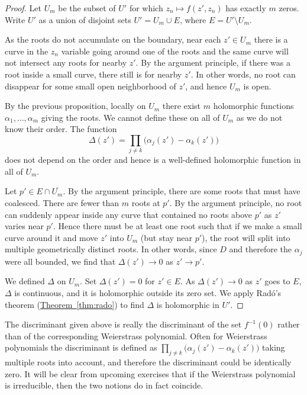 \documentclass[12pt,openany]{book}
\theoremstyle{plain}
\theoremstyle{remark}
\theoremstyle{definition}
\theoremstyle{exercise}
\theoremstyle{example}
\newcommand{\thmref}[1]{\hyperref[#1]{Theorem~\ref*{#1}}}
\begin{document}
\begin{proof}
Let $U_m$ be the subset of $U'$ for which $z_n \mapsto f(z',z_n)$
has exactly $m$ zeros.  Write $U'$ 
as a union of disjoint sets $U' = U_m \cup E$, where $E = U' \setminus U_m$.

As the roots do not accumulate on the boundary, near each $z' \in U_m$ there is a
curve in the $z_n$ variable going around one of the roots and the same curve
will not intersect any roots for nearby $z'$.
By the argument principle, if there was a root 
inside a small curve, there still is for nearby $z'$.  In other words, no
root can disappear for some small open neighborhood of $z'$, and hence $U_m$ is open.

By the previous
proposition, locally on $U_m$ there exist $m$ holomorphic functions
$\alpha_1, \ldots, \alpha_m$ giving the roots.  We cannot define
these on all of $U_m$ as we do not know their order.  The function
\begin{equation*}
\Delta(z') = \prod_{j \not= k} \bigl( \alpha_j(z') - \alpha_k(z') \bigr) 
\end{equation*}
does not depend on the order and hence is a well-defined holomorphic
function in all of $U_m$.

Let $p' \in E \cap \overline{U_m}$.
By the argument principle, there are some roots
that must have coalesced.  There are fewer than $m$ roots at $p'$.  By the
argument principle, no root
can suddenly appear inside any curve that contained no roots above $p'$ as $z'$
varies near $p'$.  Hence there must be at least one root such that if we
make a small curve around it and move $z'$ into $U_m$ (but stay near $p'$),
the root will split into multiple geometrically distinct roots.
In other words, since $D$ and therefore the $\alpha_j$ were all bounded, we
find that $\Delta(z') \to 0$ as $z' \to p'$.

We defined $\Delta$ on $U_m$.  Set $\Delta(z') = 0$ for $z' \in E$.
As $\Delta(z') \to 0$ as $z'$ goes to $E$, $\Delta$ is continuous,
and it is holomorphic outside its zero set.  We apply Rad{\'o}'s theorem
(\thmref{thm:rado}) to find $\Delta$
is holomorphic in $U'$.
\end{proof}

The discriminant given above is really the discriminant of the set
$f^{-1}(0)$ rather than of the corresponding Weierstrass polynomial.  Often
for Weierstrass polynomials the discriminant is defined as 
$\prod_{j \not= k} \bigl( \alpha_j(z') - \alpha_k(z') \bigr)$ taking
multiple roots into account, and therefore the discriminant could be
identically zero.  It will be clear from upcoming exercises that if
the Weierstrass polynomial is irreducible, then the two notions do in fact
coincide.
\end{document}
